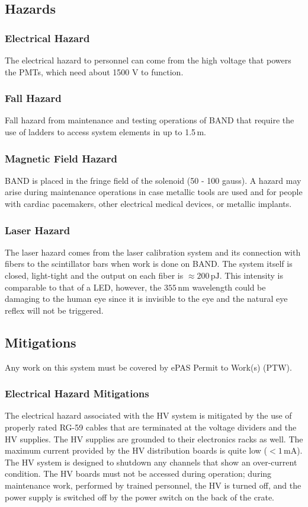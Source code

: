 \subsection{Hazards} 
\indent
\subsubsection{Electrical Hazard}
The electrical hazard to personnel can come from the high voltage that powers the PMTs, which need
about 1500 V to function. 

\subsubsection{Fall Hazard}
Fall hazard from maintenance and testing operations of BAND that require the use of ladders to access
system elements in up to 1.5\,m. 

\subsubsection{Magnetic Field Hazard}
BAND is placed in the fringe field of the solenoid (50 - 100 gauss). A hazard may arise during maintenance
operations in case metallic tools are used and for people with cardiac pacemakers, other electrical medical
devices, or metallic implants.

\subsubsection{Laser Hazard}
The laser hazard comes from the laser calibration system and its connection with fibers to the scintillator
bars when work is done on BAND. The system itself is closed, light-tight and the output on each fiber is
$\approx 200\,\mathrm{pJ}$. This intensity is comparable to that of a LED, however, the $355\,\mathrm{nm}$
wavelength could be damaging to the human eye since it is invisible to the eye and the natural eye reflex
will not be triggered. 

\subsection{Mitigations}
Any work on this system must be covered by ePAS Permit to Work(s) (PTW).

\indent
\subsubsection{Electrical Hazard Mitigations} 
The electrical hazard associated with the HV system is mitigated by the use of properly rated RG-59 cables
that are terminated at the voltage dividers and the HV supplies.
The HV supplies are grounded to their electronics racks as well. 
The maximum current provided by the HV distribution boards is quite low ($<1\,\mathrm{mA}$). The HV system
is designed to shutdown any channels that show an over-current condition. The HV boards must not be accessed
during operation; during maintenance work, performed by trained personnel, the HV is turned off, and the
power supply is switched off by the power switch on the back of the crate.

